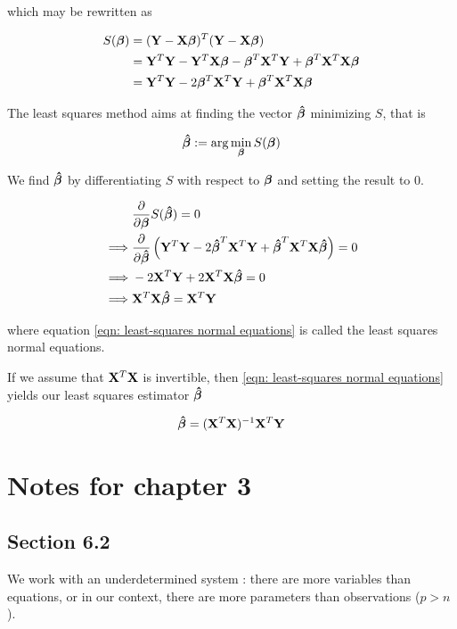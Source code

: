 which may be rewritten as

\begin{align*}
    S(\boldsymbol{\beta}) & = (\mathbf{Y} - \mathbf{X} \boldsymbol{\beta})^{T} (\mathbf{Y} - \mathbf{X} \boldsymbol{\beta})                             \\
            & = \mathbf{Y}^T \mathbf{Y} - \mathbf{Y}^T \mathbf{X} \boldsymbol{\beta} - \boldsymbol{\beta}^T \mathbf{X}^T \mathbf{Y} + \boldsymbol{\beta}^T \mathbf{X}^T \mathbf{X} \boldsymbol{\beta} \\
            & = \mathbf{Y}^T \mathbf{Y} - 2 \boldsymbol{\beta}^T \mathbf{X}^T \mathbf{Y} + \boldsymbol{\beta}^T \mathbf{X}^T \mathbf{X} \boldsymbol{\beta}              \\
\end{align*}

The least squares method aims at finding the vector $\boldsymbol{\hat{\beta}}$ minimizing \( S \), that is

\[
    \boldsymbol{\hat{\beta}} := \arg \min_{\boldsymbol{\beta}} S(\boldsymbol{\beta})
\]


We find \( \boldsymbol{\hat{\beta}} \) by differentiating \( S \) with respect to $\boldsymbol{\beta}$ and setting the result to 0.

\begin{align}
             & \frac{\partial}{\partial \boldsymbol{\beta}} S(\boldsymbol{\hat{\beta}}) = 0 \nonumber                                                                  \\
    \implies & \frac{\partial}{\partial \boldsymbol{\hat{\beta}}} \left( \mathbf{Y}^T \mathbf{Y} - 2 \boldsymbol{\hat{\beta}}^T \mathbf{X}^T \mathbf{Y} + \boldsymbol{\hat{\beta}}^T \mathbf{X}^T \mathbf{X} \boldsymbol{\hat{\beta}} \right) = 0 \nonumber \\
    \implies & - 2 \mathbf{X}^T \mathbf{Y} + 2 \mathbf{X}^T \mathbf{X} \boldsymbol{\hat{\beta}} = 0 \nonumber                                                                            \\
    \implies & \mathbf{X}^T \mathbf{X} \boldsymbol{\hat{\beta}} = \mathbf{X}^T \mathbf{Y} \label{eqn: least-squares normal equations}                                                    
\end{align}

where equation \eqref{eqn: least-squares normal equations} is called the least squares normal equations.

If we assume that \( \mathbf{X}^T \mathbf{X} \) is invertible, then \eqref{eqn: least-squares normal equations} yields our least squares estimator \( \boldsymbol{\hat{\beta}} \)

\begin{equation}
    \label{eqn: least squares estimator}
    \boldsymbol{\hat{\beta}} = (\mathbf{X}^T \mathbf{X})^{-1} \mathbf{X}^T \mathbf{Y}
\end{equation}



\section{Notes for chapter 3}
\subsection{Section 6.2}
We work with an underdetermined system : there are more variables than equations, or in our context, there are more parameters than observations (\(p>n\)).

